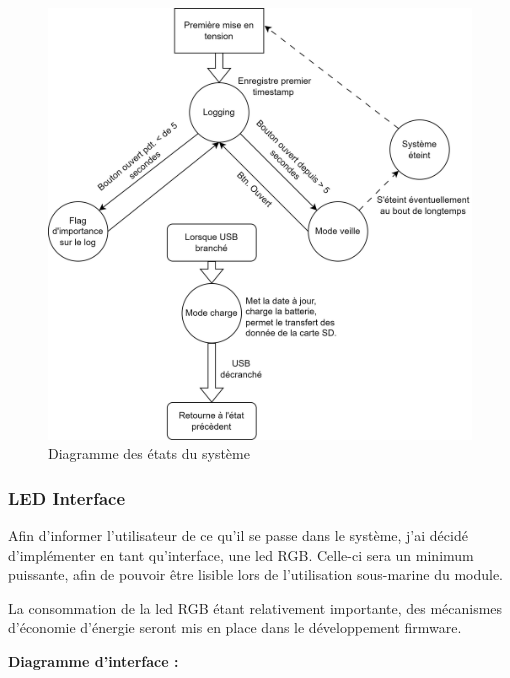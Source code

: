 {{		\clearpage
		\begin{figure}[th]
			\centering
			\includegraphics[width=1.1\linewidth]{Figures/Dev-SCH/Etats_diagramme}
			\caption{Diagramme des états du système}
			\label{fig:etatsdiagramme}
		\end{figure}
		
	}

	\clearpage
	\subsubsection{LED Interface} \label{sssec:DimLedRGB}
	{
		Afin d'informer l'utilisateur de ce qu'il se passe dans le système, j'ai décidé d'implémenter en tant qu'interface, une led RGB. Celle-ci sera un minimum puissante, afin de pouvoir être lisible lors de l'utilisation sous-marine du module.
		
		La consommation de la led RGB étant relativement importante, des mécanismes d'économie d'énergie seront mis en place dans le développement firmware. \vspace{+3mm}
		
		\textbf{Diagramme d'interface :}
		
}}
